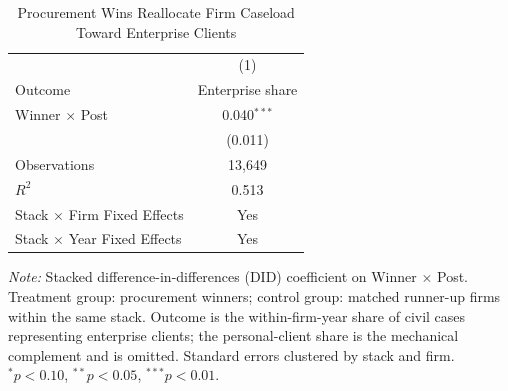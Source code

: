 \begin{table}[!htbp]
\setlength{\abovecaptionskip}{0pt}
\centering
\caption{Procurement Wins Reallocate Firm Caseload Toward Enterprise Clients}
\label{tab:firm_level_client_mix}
\begin{threeparttable}
\begin{tabular}{lc}
\toprule
 & (1) \\
Outcome & Enterprise share \\
\midrule
Winner $\times$ Post & 0.040$^{***}$ \\
& (0.011) \\
\addlinespace
Observations & 13,649 \\
$R^2$ & 0.513 \\
Stack $\times$ Firm Fixed Effects & Yes \\
Stack $\times$ Year Fixed Effects & Yes \\
\bottomrule
\end{tabular}
\begin{tablenotes}[flushleft]
\footnotesize
\item \textit{Note:} Stacked difference-in-differences (DID) coefficient on Winner $\times$ Post. Treatment group: procurement winners; control group: matched runner-up firms within the same stack. Outcome is the within-firm-year share of civil cases representing enterprise clients; the personal-client share is the mechanical complement and is omitted. Standard errors clustered by stack and firm. $^{*}p<0.10$, $^{**}p<0.05$, $^{***}p<0.01$.
\end{tablenotes}
\end{threeparttable}
\end{table}
